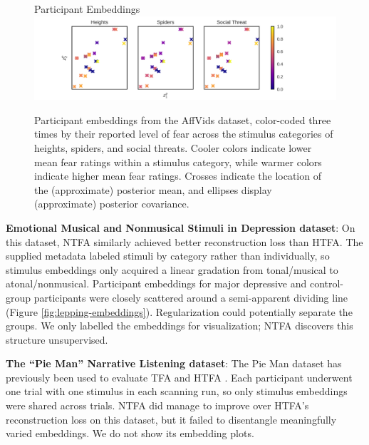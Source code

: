 \documentclass[twoside]{article}
\begin{document}
\begin{figure}[!h]
    \centering
    \textsf{Participant Embeddings} \\
    \includegraphics[width=\textwidth]{figures/affvids_norest_subject_heatmap.pdf}
    \caption{Participant embeddings from the AffVids dataset, color-coded three times by their reported level of fear across the stimulus categories of heights, spiders, and social threats. Cooler colors indicate lower mean fear ratings within a stimulus category, while warmer colors indicate higher mean fear ratings.  Crosses indicate the location of the (approximate) posterior mean, and ellipses display (approximate) posterior covariance.}
    \label{fig:affvids-subject-embeddings}
\end{figure}

\textbf{Emotional Musical and Nonmusical Stimuli in Depression dataset}: On this dataset, NTFA similarly achieved better reconstruction loss than HTFA.  The supplied metadata labeled stimuli by category rather than individually, so stimulus embeddings only acquired a linear gradation from tonal/musical to atonal/nonmusical.  Participant embeddings for major depressive and control-group participants were closely scattered around a semi-apparent dividing line (Figure \ref{fig:lepping-embeddings}).  Regularization could potentially separate the groups.  We only labelled the embeddings for visualization; NTFA discovers this structure unsupervised.

\textbf{The ``Pie Man'' Narrative Listening dataset}: The Pie Man dataset \citep{simony2016dynamic} has previously been used to evaluate TFA and HTFA  \citep{manning2018probabilistic}.  Each participant underwent one trial with one stimulus in each scanning run, so only stimulus embeddings were shared across trials.  NTFA did manage to improve over HTFA's reconstruction loss on this dataset, but it failed to disentangle meaningfully varied embeddings.  We do not show its embedding plots.
\end{document}
